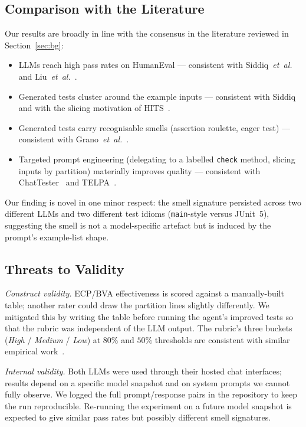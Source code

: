 \documentclass[journal]{IEEEtran}
\begin{document}
\subsection{Comparison with the Literature}
Our results are broadly in line with the consensus in the
literature reviewed in Section~\ref{sec:bg}:
\begin{itemize}
    \item LLMs reach high pass rates on HumanEval ---
    consistent with Siddiq~\emph{et~al.}~\cite{siddiq2024junit}
    and Liu~\emph{et~al.}~\cite{liu2023evalplus}.
    \item Generated tests cluster around the example
    inputs --- consistent with Siddiq and with the slicing
    motivation of HITS~\cite{wang2024hits}.
    \item Generated tests carry recognisable smells (assertion
    roulette, eager test) --- consistent with
    Grano~\emph{et~al.}~\cite{grano2024testsmells}.
    \item Targeted prompt engineering (delegating to a
    labelled \texttt{check} method, slicing inputs by
    partition) materially improves quality --- consistent
    with ChatTester~\cite{yuan2024chattester} and
    TELPA~\cite{yang2024telpa}.
\end{itemize}
Our finding is novel in one minor respect: the smell
signature persisted across two different LLMs and two
different test idioms (\texttt{main}-style versus JUnit~5),
suggesting the smell is not a model-specific artefact but is
induced by the prompt's example-list shape.

\subsection{Threats to Validity}
\emph{Construct validity.} ECP/BVA effectiveness is scored
against a manually-built table; another rater could draw the
partition lines slightly differently. We mitigated this by
writing the table before running the agent's improved tests
so that the rubric was independent of the LLM output. The
rubric's three buckets (\emph{High} / \emph{Medium} /
\emph{Low}) at $80\%$ and $50\%$ thresholds are consistent
with similar empirical work~\cite{siddiq2024junit}.

\emph{Internal validity.} Both LLMs were used through their
hosted chat interfaces; results depend on a specific model
snapshot and on system prompts we cannot fully observe. We
logged the full prompt/response pairs in the repository to
keep the run reproducible. Re-running the experiment on a
future model snapshot is expected to give similar pass rates
but possibly different smell signatures.
\end{document}
